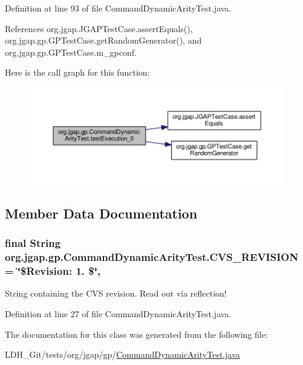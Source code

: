 Definition at line 93 of file Command\-Dynamic\-Arity\-Test.\-java.



References org.\-jgap.\-J\-G\-A\-P\-Test\-Case.\-assert\-Equals(), org.\-jgap.\-gp.\-G\-P\-Test\-Case.\-get\-Random\-Generator(), and org.\-jgap.\-gp.\-G\-P\-Test\-Case.\-m\-\_\-gpconf.



Here is the call graph for this function\-:
\nopagebreak
\begin{figure}[H]
\begin{center}
\leavevmode
\includegraphics[width=350pt]{classorg_1_1jgap_1_1gp_1_1_command_dynamic_arity_test_a1198e1ca8ce61a36717f6b84b08ebac2_cgraph}
\end{center}
\end{figure}




\subsection{Member Data Documentation}
\hypertarget{classorg_1_1jgap_1_1gp_1_1_command_dynamic_arity_test_a89ac117fa956c7a608c04d2f74db30b2}{
\subsubsection[{C\-V\-S\-\_\-\-R\-E\-V\-I\-S\-I\-O\-N}]{\setlength{\rightskip}{0pt plus 5cm}final String org.\-jgap.\-gp.\-Command\-Dynamic\-Arity\-Test.\-C\-V\-S\-\_\-\-R\-E\-V\-I\-S\-I\-O\-N = \char`\"{}\$Revision\-: 1. \$\char`\"{}\hspace{0.3cm}{\ttfamily [static]}, {\ttfamily [private]}}}\label{classorg_1_1jgap_1_1gp_1_1_command_dynamic_arity_test_a89ac117fa956c7a608c04d2f74db30b2}
String containing the C\-V\-S revision. Read out via reflection! 

Definition at line 27 of file Command\-Dynamic\-Arity\-Test.\-java.



The documentation for this class was generated from the following file\-:\begin{DoxyCompactItemize}
\item 
L\-D\-H\-\_\-\-Git/tests/org/jgap/gp/\hyperlink{_command_dynamic_arity_test_8java}{Command\-Dynamic\-Arity\-Test.\-java}\end{DoxyCompactItemize}
